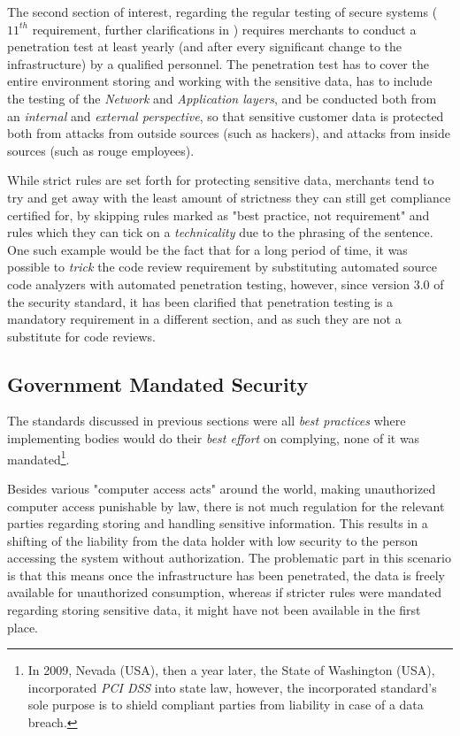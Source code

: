 \documentclass[a4paper,12pt]{article}
\begin{document}
	The second section of interest, regarding the regular testing of secure systems ($11^{th}$ requirement, further clarifications in \cite{pcireq11}) requires merchants to conduct a penetration test at least yearly (and after every significant change to the infrastructure) by a qualified personnel. The penetration test has to cover the entire environment storing and working with the sensitive data, has to include the testing of the \textit{Network} and \textit{Application layers}, and be conducted both from an \textit{internal} and \textit{external perspective}, so that sensitive customer data is protected both from attacks from outside sources (such as hackers), and attacks from inside sources (such as rouge employees).
	
	While strict rules are set forth for protecting sensitive data, merchants tend to try and get away with the least amount of strictness they can still get compliance certified for, by skipping rules marked as "best practice, not requirement" and rules which they can tick on a \textit{technicality} due to the phrasing of the sentence. One such example would be the fact that for a long period of time, it was possible to \textit{trick} the code review requirement by substituting automated source code analyzers with automated penetration testing, however, since version 3.0 of the security standard, it has been clarified that penetration testing is a mandatory requirement in a different section, and as such they are not a substitute for code reviews.
	
\subsection{Government Mandated Security}
	
	The standards discussed in previous sections were all \textit{best practices} where implementing bodies would do their \textit{best effort} on complying, none of it was mandated\footnote{In 2009, Nevada (USA), then a year later, the State of Washington (USA), incorporated \textit{PCI DSS} into state law\cite{wash10}, however, the incorporated standard's sole purpose is to shield compliant parties from liability in case of a data breach.}.
	
	Besides various "computer access acts" around the world, making unauthorized computer access punishable by law, there is not much regulation for the relevant parties regarding storing and handling sensitive information. This results in a shifting  of the liability from the data holder with low security to the person accessing the system without authorization. The problematic part in this scenario is that this means once the infrastructure has been penetrated, the data is freely available for unauthorized consumption, whereas if stricter rules were mandated regarding storing sensitive data, it might have not been available in the first place.
	
\end{document}
